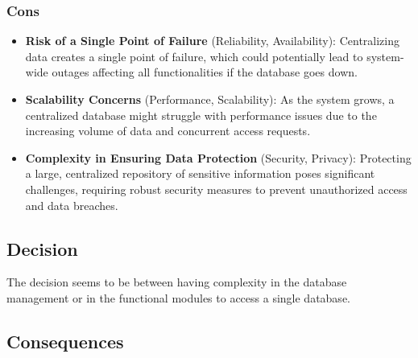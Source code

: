 \subsubsection*{Cons}
\begin{itemize}[noitemsep]
    \item \textbf{Risk of a Single Point of Failure} (Reliability, Availability): Centralizing data creates a single point of failure, which could potentially lead to system-wide outages affecting all functionalities if the database goes down.
    \item \textbf{Scalability Concerns} (Performance, Scalability): As the system grows, a centralized database might struggle with performance issues due to the increasing volume of data and concurrent access requests.
    \item \textbf{Complexity in Ensuring Data Protection} (Security, Privacy): Protecting a large, centralized repository of sensitive information poses significant challenges, requiring robust security measures to prevent unauthorized access and data breaches.
\end{itemize}

\subsection*{Decision}
The decision seems to be between having complexity in the database management or in the functional modules to access a single database.
\subsection*{Consequences}

